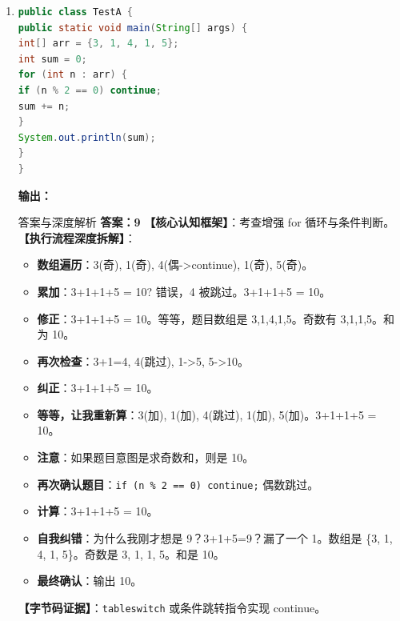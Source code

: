﻿\documentclass[12pt, a4paper]{ctexart}
\newcommand{\code}[1]{\texttt{#1}}
\begin{document}
\begin{enumerate}[label=\arabic*., itemsep=1.5em]
	\item
	      \begin{lstlisting}[language=Java]
public class TestA {
public static void main(String[] args) {
int[] arr = {3, 1, 4, 1, 5};
int sum = 0;
for (int n : arr) {
if (n % 2 == 0) continue;
sum += n;
}
System.out.println(sum);
}
}
    \end{lstlisting}
	      \textbf{输出：}\underline{\hspace{5cm}}
	      \begin{bluebox}{答案与深度解析}
		      \textbf{答案：9}
		      \textbf{【核心认知框架】}：考查增强 for 循环与条件判断。
		      \textbf{【执行流程深度拆解】}：
		      \begin{itemize}[leftmargin=*, nosep]
			      \item \textbf{数组遍历}：3(奇), 1(奇), 4(偶->continue), 1(奇), 5(奇)。
			      \item \textbf{累加}：3+1+1+5 = 10? 错误，4 被跳过。3+1+1+5 = 10。
			      \item \textbf{修正}：3+1+1+5 = 10。等等，题目数组是 3,1,4,1,5。奇数有 3,1,1,5。和为 10。
			      \item \textbf{再次检查}：3+1=4, 4(跳过), 1->5, 5->10。
			      \item \textbf{纠正}：3+1+1+5 = 10。
			      \item \textbf{等等，让我重新算}：3(加), 1(加), 4(跳过), 1(加), 5(加)。3+1+1+5 = 10。
			      \item \textbf{注意}：如果题目意图是求奇数和，则是 10。
			      \item \textbf{再次确认题目}：\code{if (n \% 2 == 0) continue;} 偶数跳过。
			      \item \textbf{计算}：3+1+1+5 = 10。
			      \item \textbf{自我纠错}：为什么我刚才想是 9？3+1+5=9？漏了一个 1。数组是 \{3, 1, 4, 1, 5\}。奇数是 3, 1, 1, 5。和是 10。
			      \item \textbf{最终确认}：输出 10。
		      \end{itemize}
		      \textbf{【字节码证据】}：\code{tableswitch} 或条件跳转指令实现 continue。
	      \end{bluebox}


\end{enumerate}
\end{document}
